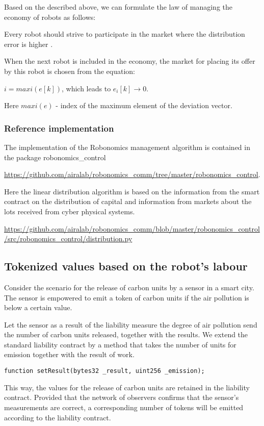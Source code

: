 \documentclass{article}
\begin{document}
Based on the described above, we can formulate the law of managing the economy of robots as follows:

Every robot should strive to participate in the market where the distribution error is higher \cite{LonshakovSergey2017HowProtocol}.

When the next robot is included in the economy, the market for placing its offer by this robot is chosen from the equation:

$ i = maxi(e[k])$, which leads to $ e_i[k] \rightarrow 0 $.

Here  $ maxi(e) $ - index of the maximum element of the deviation vector.

\subsubsection{Reference implementation}

The implementation of the Robonomics management algorithm is contained in the package robonomics\_control

\url{https://github.com/airalab/robonomics_comm/tree/master/robonomics_control}. 

Here the linear distribution algorithm is based on the information from the smart contract on the distribution of capital and information from markets about the lots received from cyber physical systems.

\url{https://github.com/airalab/robonomics_comm/blob/master/robonomics_control/src/robonomics_control/distribution.py}

\subsection{Tokenized values based on the robot's labour}

Consider the scenario for the release of carbon units by a sensor in a smart city. The sensor is empowered to emit a token of carbon units if the air pollution is below a certain value.

Let the sensor as a result of the liability measure the degree of air pollution send the number of carbon units released, together with the results. We extend the standard liability contract by a method that takes the number of units for emission together with the result of work.
\begin{lstlisting}
function setResult(bytes32 _result, uint256 _emission);
\end{lstlisting}


This way, the values for the release of carbon units are retained in the liability contract. Provided that the network of observers confirms that the sensor's measurements are correct, a corresponding number of tokens will be emitted according to the liability contract.
\end{document}
